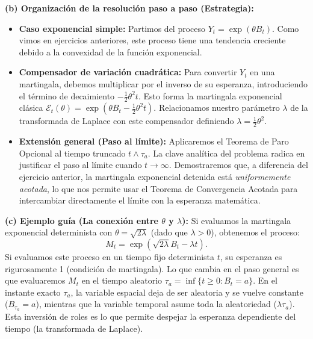 \documentclass[11pt, letterpaper]{article}
\begin{document}
\vspace{5mm}

\begin{solucion}
    \textbf{(b) Organización de la resolución paso a paso (Estrategia):}
    \begin{itemize}
        \item[(i)] \textbf{Caso exponencial simple:} Partimos del proceso $Y_t = \exp(\theta B_t)$. Como vimos en ejercicios anteriores, este proceso tiene una tendencia creciente debido a la convexidad de la función exponencial.
        \item[(ii)] \textbf{Compensador de variación cuadrática:} Para convertir $Y_t$ en una martingala, debemos multiplicar por el inverso de su esperanza, introduciendo el término de decaimiento $-\frac{1}{2}\theta^2 t$. Esto forma la martingala exponencial clásica $\mathcal{E}_t(\theta) = \exp(\theta B_t - \frac{1}{2}\theta^2 t)$. Relacionamos nuestro parámetro $\lambda$ de la transformada de Laplace con este compensador definiendo $\lambda = \frac{1}{2}\theta^2$.
        \item[(iii)] \textbf{Extensión general (Paso al límite):} Aplicaremos el Teorema de Paro Opcional al tiempo truncado $t \wedge \tau_a$. La clave analítica del problema radica en justificar el paso al límite cuando $t \to \infty$. Demostraremos que, a diferencia del ejercicio anterior, la martingala exponencial detenida está \textit{uniformemente acotada}, lo que nos permite usar el Teorema de Convergencia Acotada para intercambiar directamente el límite con la esperanza matemática.
    \end{itemize}

    \vspace{3mm}
    \textbf{(c) Ejemplo guía (La conexión entre $\theta$ y $\lambda$):}
    Si evaluamos la martingala exponencial determinista con $\theta = \sqrt{2\lambda}$ (dado que $\lambda > 0$), obtenemos el proceso:
    \[ M_t = \exp\left( \sqrt{2\lambda} B_t - \lambda t \right). \]
    Si evaluamos este proceso en un tiempo fijo determinista $t$, su esperanza es rigurosamente 1 (condición de martingala). 
    Lo que cambia en el paso general es que evaluaremos $M_t$ en el tiempo aleatorio $\tau_a = \inf\{t \ge 0 : B_t = a\}$. En el instante exacto $\tau_a$, la variable espacial deja de ser aleatoria y se vuelve constante ($B_{\tau_a} = a$), mientras que la variable temporal asume toda la aleatoriedad ($\lambda \tau_a$). Esta inversión de roles es lo que permite despejar la esperanza dependiente del tiempo (la transformada de Laplace).


\end{solucion}
\end{document}
